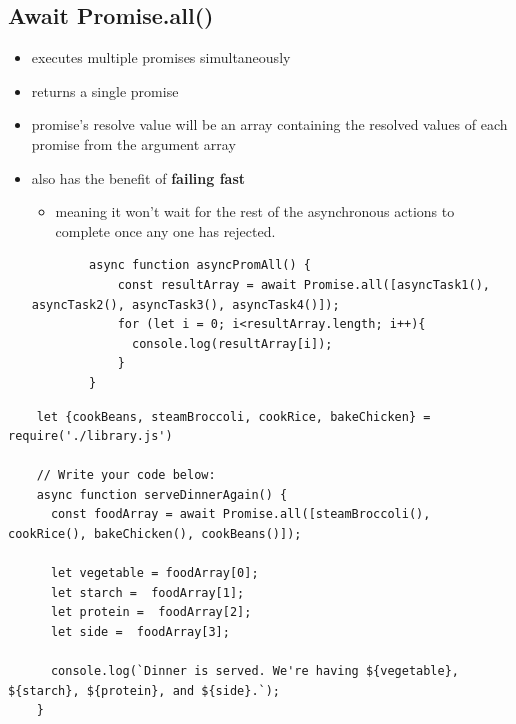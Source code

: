 \documentclass[12pt]{article}
\begin{document}
\subsection{Await Promise.all()}
\begin{itemize}
    \item executes multiple promises simultaneously
    \item returns a single promise
    \item promise’s resolve value will be an array containing the resolved
    values of each promise from the argument array
    \item also has the benefit of \textbf{failing fast}
    \begin{itemize}
        \item meaning it won’t wait for the rest of the asynchronous actions to complete once any one has rejected.
    \end{itemize}

    \begin{lstlisting}
        async function asyncPromAll() {
            const resultArray = await Promise.all([asyncTask1(), asyncTask2(), asyncTask3(), asyncTask4()]);
            for (let i = 0; i<resultArray.length; i++){
              console.log(resultArray[i]);
            }
        }
    \end{lstlisting}
\end{itemize}

\begin{lstlisting}
    let {cookBeans, steamBroccoli, cookRice, bakeChicken} = require('./library.js')

    // Write your code below:
    async function serveDinnerAgain() {
      const foodArray = await Promise.all([steamBroccoli(), cookRice(), bakeChicken(), cookBeans()]);

      let vegetable = foodArray[0];
      let starch =  foodArray[1];
      let protein =  foodArray[2];
      let side =  foodArray[3];

      console.log(`Dinner is served. We're having ${vegetable}, ${starch}, ${protein}, and ${side}.`);
    }
\end{lstlisting}
\end{document}
